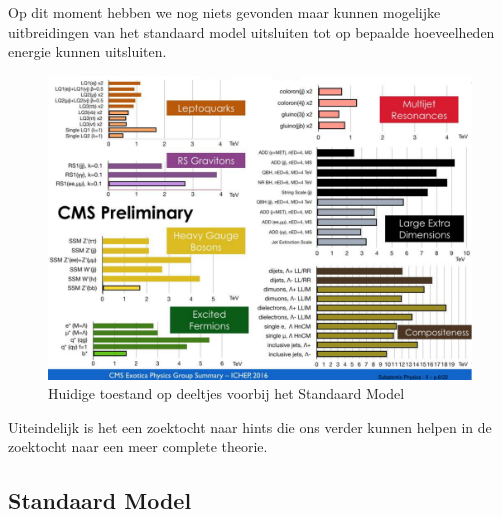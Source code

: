 \documentclass[../main.tex]{subfiles}
\begin{document}
Op dit moment hebben we nog niets gevonden maar kunnen mogelijke uitbreidingen van het standaard model uitsluiten tot op bepaalde hoeveelheden energie kunnen uitsluiten.

\begin{figure}[h]
    \centering
    \includegraphics[width=0.6\linewidth]{physics_beyond_the_standard_model/current_state.png}
    \caption{Huidige toestand op deeltjes voorbij het Standaard Model}%
    \label{fig:physics_beyond_the_standard_model/current_state}
\end{figure}

Uiteindelijk is het een zoektocht naar hints die ons verder kunnen helpen in de zoektocht naar een meer complete theorie.

\subsection{Standaard Model}%
\label{sub:standaard_model}
\end{document}
